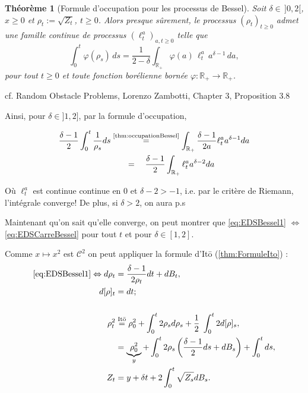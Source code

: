 \documentclass[openany]{book}
\makeatletter
\newcommand{\R}{\mathbb{R}}
\newcommand{\1}{\mathbbm{1}}
\renewenvironment{proof}[1][\textbf{\textit{Démonstration}}]{%
  \par\pushQED{\qed}%
  \normalfont\topsep6\p@\@plus6\p@\relax
  \trivlist\item[\hskip\labelsep
    #1\@addpunct{.}]\ignorespaces
}{%
  \popQED\endtrivlist\@endpefalse
}
\theoremstyle{thmfont}
\newtheorem{theorem}{Théorème}[chapter]
\theoremstyle{deffont}
\theoremstyle{thmfont}
\theoremstyle{deffont}
\makeatother
\begin{document}
\begin{theorem}[Formule d'occupation pour les processus de Bessel]
  \label{thm:occupationBessel}
  Soit $\delta \in \, ]0,2[$, $x \geq 0$ et $\rho_t := \sqrt{Z_t}$, $t \geq 0$. Alors presque sûrement, le processus $(\rho_t)_{t \geq 0}$ admet une famille continue de processus $(\ell_t^a)_{a, t \geq 0}$ telle que
\[
\int_0^t \varphi(\rho_s)\, ds = \frac{1}{2 - \delta} \int_{\mathbb{R}_+} \varphi(a)\, \ell_t^a\, a^{\delta - 1}\, da,
\tag{3.7}
\]
pour tout $t \geq 0$ et toute fonction borélienne bornée $\varphi : \mathbb{R}_+ \rightarrow \mathbb{R}_+$.
\end{theorem}
\begin{proof}cf. Random Obstacle Problems, Lorenzo Zambotti, Chapter 3, Proposition 3.8\end{proof}

Ainsi, pour $\delta \in ]1,2]$, par la formule d'occupation, 

\begin{align*}
  \dfrac{\delta-1}{2}\int_0^t \dfrac{1}{\rho_s} ds &\overset{\text{\autoref{thm:occupationBessel}}}{=} \int_{\R_+} \dfrac{\delta-1}{2 a} \ell_t^a a^{\delta-1} da\\
  &\quad\;\;\;=\quad \dfrac{\delta-1}{2} \int_{\R_+} \ell_t^a a^{\delta-2} da
\end{align*}

Où $\ell_t^a$ est continue continue en $0$ et $\delta-2 >-1$, i.e. par le critère de Riemann, l'intégrale converge! De plus, si $\delta > 2$, on aura p.s

Maintenant qu'on sait qu'elle converge, on peut montrer que \eqref{eq:EDSBessel1} $\Leftrightarrow$ \eqref{eq:EDSCarreBessel} pour tout $t$ et pour $\delta \in [1,2]$.

  Comme $x \mapsto x^2$ est $\mathcal C^2$ on peut appliquer la formule d'Itō (\autoref{thm:FormuleIto}) :
\begin{alignat*}{1}
  \eqref{eq:EDSBessel1} \Leftrightarrow d\rho_t
  &= \dfrac{\delta -1}{2\rho_t}dt + dB_t,\\
  d[\rho]_t &= dt;\\\\
  \rho_t^2 &\overset{\text{Itō}}{=} \rho_0^2 + \int_0^t 2\rho_s d\rho_s + \dfrac{1}{2}\;\int_0^t2 d[\rho]_s,\\
  &= \underbrace{\rho_0^2}_y + \int_0^t2 \rho_s \left(\dfrac{\delta -1}{2}ds + dB_s\right) +\int_0^t ds,\\
  Z_t &= y + \delta t + 2\int_0^t \sqrt{Z_s} dB_s.
\end{alignat*}
\end{document}
